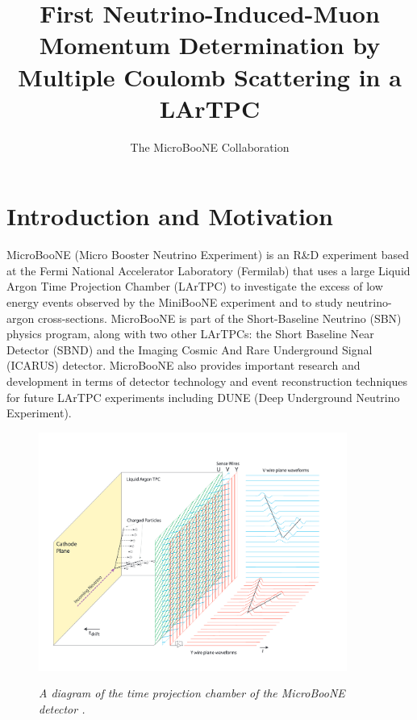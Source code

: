 \documentclass[a4paper,11pt]{article}
\author{The MicroBooNE Collaboration}
\title{First Neutrino-Induced-Muon Momentum Determination by Multiple Coulomb Scattering in a LArTPC}
\begin{document}
\maketitle
\flushbottom

\section{Introduction and Motivation}\label{sec:intro}

MicroBooNE (Micro Booster Neutrino Experiment) is an R\&D experiment based at the Fermi National Accelerator Laboratory (Fermilab) that uses a large Liquid Argon Time Projection Chamber (LArTPC) to investigate the excess of low energy events observed by the MiniBooNE experiment \cite{Aguilar-Arevalo:2013pmq} and to study neutrino-argon cross-sections. MicroBooNE is part of the Short-Baseline Neutrino (SBN) physics program, along with two other LArTPCs: the Short Baseline Near Detector (SBND) and the Imaging Cosmic And Rare Underground Signal (ICARUS) detector. MicroBooNE also provides important research and development in terms of detector technology and event reconstruction techniques for future LArTPC experiments including DUNE (Deep Underground Neutrino Experiment).\\

\begin{figure}[ht!]
\centering
	\includegraphics[width=0.9\textwidth]{Figures/static_figs/detector2.png} \\
\caption{\textit{A diagram of the time projection chamber of the MicroBooNE detector \cite{lartpc}.}}\label{detector_fig}
\end{figure}
\end{document}
